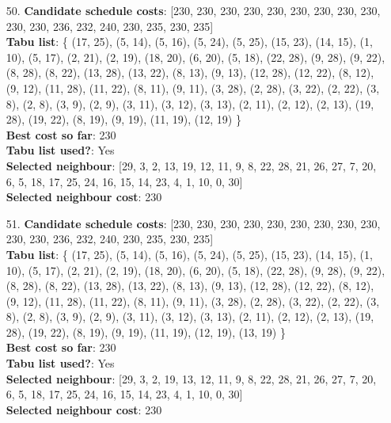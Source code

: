 \documentclass[fleqn]{article}
\begin{document}
\begin{itemize}
    \item[50.] \textbf{Candidate schedule costs}: [230, 230, 230, 230, 230, 230, 230, 230, 230, 230, 230, 236, 232, 240, 230, 235, 230, 235] \\
    \textbf{Tabu list}: \{ (17, 25), (5, 14), (5, 16), (5, 24), (5, 25), (15, 23), (14, 15), (1, 10), (5, 17), (2, 21), (2, 19), (18, 20), (6, 20), (5, 18), (22, 28), (9, 28), (9, 22), (8, 28), (8, 22), (13, 28), (13, 22), (8, 13), (9, 13), (12, 28), (12, 22), (8, 12), (9, 12), (11, 28), (11, 22), (8, 11), (9, 11), (3, 28), (2, 28), (3, 22), (2, 22), (3, 8), (2, 8), (3, 9), (2, 9), (3, 11), (3, 12), (3, 13), (2, 11), (2, 12), (2, 13), (19, 28), (19, 22), (8, 19), (9, 19), (11, 19), (12, 19) \} \\
    \textbf{Best cost so far}: 230 \\
    \textbf{Tabu list used?}: Yes \\
    \textbf{Selected neighbour}: [29, 3, 2, 13, 19, 12, 11, 9, 8, 22, 28, 21, 26, 27, 7, 20, 6, 5, 18, 17, 25, 24, 16, 15, 14, 23, 4, 1, 10, 0, 30] \\
    \textbf{Selected neighbour cost}: 230
      

    \item[51.] \textbf{Candidate schedule costs}: [230, 230, 230, 230, 230, 230, 230, 230, 230, 230, 230, 236, 232, 240, 230, 235, 230, 235] \\
    \textbf{Tabu list}: \{ (17, 25), (5, 14), (5, 16), (5, 24), (5, 25), (15, 23), (14, 15), (1, 10), (5, 17), (2, 21), (2, 19), (18, 20), (6, 20), (5, 18), (22, 28), (9, 28), (9, 22), (8, 28), (8, 22), (13, 28), (13, 22), (8, 13), (9, 13), (12, 28), (12, 22), (8, 12), (9, 12), (11, 28), (11, 22), (8, 11), (9, 11), (3, 28), (2, 28), (3, 22), (2, 22), (3, 8), (2, 8), (3, 9), (2, 9), (3, 11), (3, 12), (3, 13), (2, 11), (2, 12), (2, 13), (19, 28), (19, 22), (8, 19), (9, 19), (11, 19), (12, 19), (13, 19) \} \\
    \textbf{Best cost so far}: 230 \\
    \textbf{Tabu list used?}: Yes \\
    \textbf{Selected neighbour}: [29, 3, 2, 19, 13, 12, 11, 9, 8, 22, 28, 21, 26, 27, 7, 20, 6, 5, 18, 17, 25, 24, 16, 15, 14, 23, 4, 1, 10, 0, 30] \\
    \textbf{Selected neighbour cost}: 230
      


\end{itemize}
\end{document}
